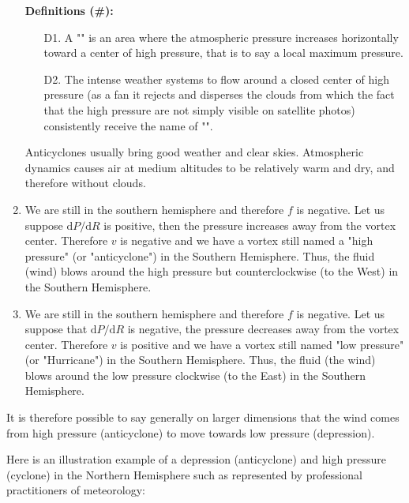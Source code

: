 \begin{enumerate}
		\textbf{Definitions (\#\mydef):} 
		\begin{enumerate}
			\item[D1.] A "" is an area where the atmospheric pressure increases horizontally toward a center of high pressure, that is to say a local maximum pressure.
	
			\item[D2.] The intense weather systems to flow around a closed center of high pressure (as a fan it rejects and disperses the clouds from which the fact that the high pressure are not simply visible on satellite photos) consistently receive the name of "".
		\end{enumerate}
		\begin{tcolorbox}[title=Remark,colframe=black,arc=10pt]
		Anticyclones usually bring good weather and clear skies. Atmospheric dynamics causes air at medium altitudes to be relatively warm and dry, and therefore without clouds.
		\end{tcolorbox}

		\item We are still in the southern hemisphere and therefore $f$ is negative. Let us suppose $\mathrm{d}P /\mathrm{d}R$ is positive, then the pressure increases away from the vortex center. Therefore $v$ is negative and we have a vortex still named a "high pressure" (or "anticyclone") in the Southern Hemisphere. Thus, the fluid (wind) blows around the high pressure but counterclockwise (to the West) in the Southern Hemisphere.

		\item We are still in the southern hemisphere and therefore $f$ is negative. Let us suppose that $\mathrm{d}P/\mathrm{d}R$ is negative, the pressure decreases away from the vortex center. Therefore $v$ is positive and we have a vortex still named "low pressure" (or "Hurricane") in the Southern Hemisphere. Thus, the fluid (the wind) blows around the low pressure clockwise (to the East) in the Southern Hemisphere.
	\end{enumerate}
	\begin{tcolorbox}[title=Remark,colframe=black,arc=10pt]
	It is therefore possible to say generally on larger dimensions that the wind comes from high pressure (anticyclone) to move towards low pressure (depression).
	\end{tcolorbox}
	Here is an illustration example of a depression (anticyclone) and high pressure (cyclone) in the Northern Hemisphere such as represented by professional practitioners of meteorology:
